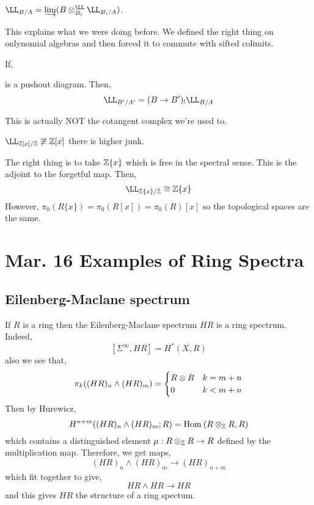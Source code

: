 \documentclass[12pt]{article}
\begin{document}
\begin{cor}
$\LL_{B/A} = \dlim (B \ot_{B_i}^{\LL} \LL_{B_i/A})$.
\end{cor}

\begin{rmk}
This explains what we were doing before. We defined the right thing on onlynomial algebras and then forced it to commute with sifted colimits.
\end{rmk}

\begin{prop}
If,
\begin{center}
\end{center}
is a pushout diagram. Then,
\[ \LL_{B'/A'} = (B \to B')_{!} \LL_{B/A} \]
\end{prop}

\begin{rmk}
This is actually NOT the cotangent complex we're used to. 
\end{rmk}

\begin{example}
$\LL_{\Z[x]/\Z} \not\cong \ZZ[x]$ there is higher junk.
\end{example}

\begin{rmk}
The right thing is to take $\mathbb{Z} \{ x \}$ which is free in the spectral sense. This is the adjoint to the forgetful map. Then,
\[ \LL_{\Z \{ x \}/\Z} \cong \ZZ \{ x \} \]
However, $\pi_0(R \{ x \}) = \pi_0(R[x]) = \pi_0(R)[x]$ so the topological spaces are the same. 
\end{rmk}

\section{Mar. 16 Examples of Ring Spectra}


\subsection{Eilenberg-Maclane spectrum}

If $R$ is a ring then the Eilenberg-Maclane spectrum $HR$ is a ring spectrum. Indeed,
\[ [ \Sigma^\infty, HR] = H^*(X, R) \]
also we see that,
\[ \pi_k((HR)_n \wedge (HR)_m) = 
\begin{cases}
R \otimes R & k = m + n
\\
0 & k < m + n
\end{cases} \]
Then by Hurewicz,
\[ H^{n+m}((HR)_n \wedge (HR)_m; R) = \mathrm{Hom}_{} \left( R \otimes_{\mathbb{Z}} R, R \right) \]
which contains a distinguished element $\mu : R \otimes_{\mathbb{Z}} R \to R$ defined by the multiplication map. Therefore, we get maps,
\[ (HR)_n \wedge (HR)_m \to (HR)_{n+m} \]
which fit together to give,
\[ HR \wedge HR \to HR \]
and this gives $HR$ the structure of a ring spectum.
\end{document}
